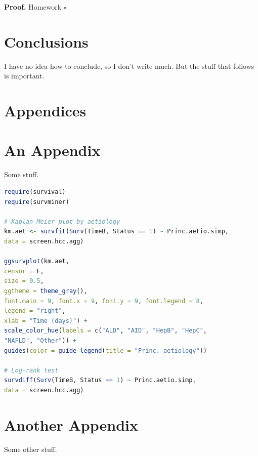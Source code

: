 \documentclass[11pt,twoside]{article}
\numberwithin{Theorem}{section}
\numberwithin{Definition}{section}
\numberwithin{Lemma}{section}
\numberwithin{Algorithm}{section}
\numberwithin{equation}{section}
\begin{document}
\noindent
\textbf{Proof.}
Homework
\hfill $\square$
\cleardoublepage


\section{Conclusions}
I have no idea how to conclude, so I don't write much. But the stuff that follows is important.
\clearpage


\clearpage

\appendix
\section*{Appendices}

\section{An Appendix}
\label{app:one}

Some stuff.

\begin{lstlisting}[language = R]
require(survival)
require(survminer)

# Kaplan-Meier plot by aetiology
km.aet <- survfit(Surv(TimeB, Status == 1) ~ Princ.aetio.simp,
data = screen.hcc.agg)

ggsurvplot(km.aet,
censor = F,
size = 0.5,
ggtheme = theme_gray(),
font.main = 9, font.x = 9, font.y = 9, font.legend = 8,
legend = "right",
xlab = "Time (days)") +
scale_color_hue(labels = c("ALD", "AID", "HepB", "HepC",
"NAFLD", "Other")) +
guides(color = guide_legend(title = "Princ. aetiology"))

# Log-rank test
survdiff(Surv(TimeB, Status == 1) ~ Princ.aetio.simp,
data = screen.hcc.agg)

\end{lstlisting}

\clearpage

\section{Another Appendix}
\label{app:two}

Some other stuff.
\end{document}
